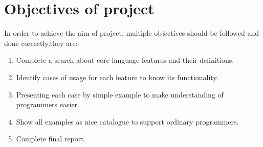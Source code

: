 \documentclass[12pt,a4paper]{report}
\begin{document}
\section{Objectives of project}
\label{section:objectives of project}
In order to achieve the aim of project, multiple objectives should be followed and done correctly,they are:-
 \begin{enumerate}
   \item Complete a search about core language features and their definitions.
   \item Identify cases of usage for each feature  to know its functionality.
   \item Presenting each case by simple example to make understanding of \linebreak programmers easier.
   \item Show all examples as nice catalogue to support ordinary \linebreak programmers.
   \item Complete final report.
 \end{enumerate}       
 
  
\end{document}
